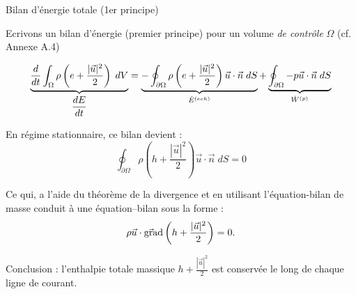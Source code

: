 \begin{frame}{Bilan d'énergie totale (1er principe)}
\small

Ecrivons un bilan d'énergie (premier principe) pour un volume {\em de contrôle} $\Omega$ (cf. Annexe A.4)

\begin{equation}
		\underbrace{\displaystyle \frac{d }{dt} \int_{\Omega} \rho \left( e + \frac{ |\vec{u}|^2}{2} \right) \; dV
		}_{\displaystyle \frac{d E}{dt} }		 
		= \underbrace{  - \oint_{\partial \Omega}  \rho \left( e + \frac{ |\vec{u}|^2}{2} \right) \vec{u} \cdot \vec{n} \; dS
		}_{\dot{E}^{(ech)}}
		+ \underbrace{ \oint_{\partial \Omega} -p \vec{u} \cdot  \vec{n}   \; dS 
		}_{\dot{W}^{(p)}} 
		\label{eq:bilan_global_eulerien_e1}
\end{equation}

{}

\smallskip
\pause

En régime stationnaire, ce bilan devient :
\begin{equation}
 \oint_{\partial \Omega}  \rho \left( h + \frac{ |\vec{u}|^2}{2} \right) \vec{u} \cdot \vec{n} \; dS
=0		
\label{eq:bilan_global_eulerien_e2}
\end{equation}

\pause

Ce qui, a l'aide du théorème de la divergence et en utilisant l'équation-bilan de masse 
conduit à une équation--bilan sous la forme :
$$ 
\rho \vec{u} \cdot \vec{\mbox{\rm gra}}\mbox{\rm d} \left( h + \frac{|\vec{u}|^2}{2} \right) = 0. 
$$

\medskip
\pause

Conclusion : l'enthalpie totale massique $h + \frac{|\vec{u}|^2}{2}$ est conservée le long de chaque ligne de courant.




\end{frame}


